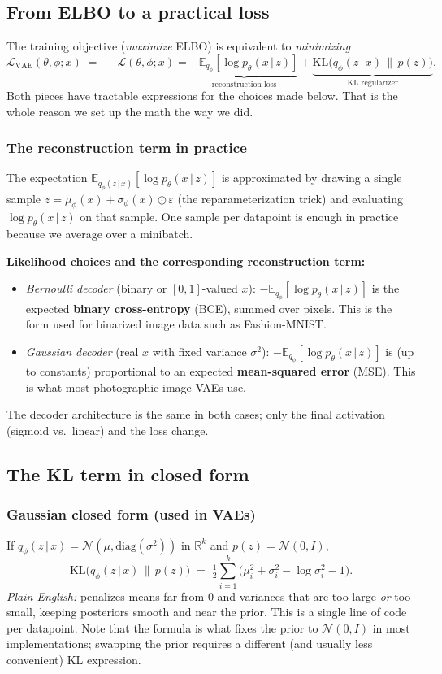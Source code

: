 \documentclass[11pt]{article}
\newcommand{\E}{\mathbb{E}}
\newcommand{\KL}{\mathrm{KL}}
\newcommand{\given}{\,\vert\,}
\newcommand{\R}{\mathbb{R}}
\theoremstyle{remark}
\begin{document}
\subsection{From ELBO to a practical loss}
The training objective (\emph{maximize} ELBO) is equivalent to \emph{minimizing}
\[
\mathcal L_{\text{VAE}}(\theta,\phi;x) \;=\; -\mathcal L(\theta,\phi;x)
= \underbrace{-\E_{q_\phi}[\log p_\theta(x\given z)]}_{\text{reconstruction loss}}
+ \underbrace{\KL\!\big(q_\phi(z\given x)\,\|\,p(z)\big)}_{\text{KL regularizer}} .
\]
Both pieces have tractable expressions for the choices made below. That is the whole reason we set up the math the way we did.

\subsubsection*{The reconstruction term in practice}
The expectation $\E_{q_\phi(z\given x)}[\log p_\theta(x\given z)]$ is approximated by drawing a single sample $z=\mu_\phi(x)+\sigma_\phi(x)\odot\varepsilon$ (the reparameterization trick) and evaluating $\log p_\theta(x\given z)$ on that sample. One sample per datapoint is enough in practice because we average over a minibatch.

\textbf{Likelihood choices and the corresponding reconstruction term:}
\begin{itemize}[leftmargin=1.2em]
  \item \emph{Bernoulli decoder} (binary or $[0,1]$-valued $x$): $-\E_{q_\phi}[\log p_\theta(x\given z)]$ is the expected \textbf{binary cross-entropy} (BCE), summed over pixels. This is the form used for binarized image data such as Fashion-MNIST.
  \item \emph{Gaussian decoder} (real $x$ with fixed variance $\sigma^2$): $-\E_{q_\phi}[\log p_\theta(x\given z)]$ is (up to constants) proportional to an expected \textbf{mean-squared error} (MSE). This is what most photographic-image VAEs use.
\end{itemize}
The decoder architecture is the same in both cases; only the final activation (sigmoid vs.\ linear) and the loss change.

\subsection{The KL term in closed form}
\subsubsection*{Gaussian closed form (used in VAEs)}
If $q_\phi(z\given x)=\mathcal N(\mu,\mathrm{diag}(\sigma^2))$ in $\R^k$ and $p(z)=\mathcal N(0,I)$,
\[
\KL\!\big(q_\phi(z\given x)\,\|\,p(z)\big) \;=\; \tfrac12 \sum_{i=1}^k\Big(\mu_i^2+\sigma_i^2-\log\sigma_i^2-1\Big).
\]
\emph{Plain English:} penalizes means far from 0 and variances that are too large \emph{or} too small, keeping posteriors smooth and near the prior. This is a single line of code per datapoint. Note that the formula is what fixes the prior to $\mathcal N(0,I)$ in most implementations; swapping the prior requires a different (and usually less convenient) KL expression.
\end{document}
